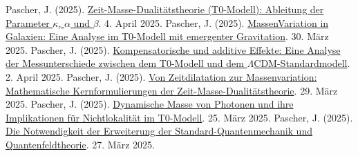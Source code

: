 \documentclass[a4paper,12pt]{article}
\begin{document}
	\begin{thebibliography}{99}
		 Pascher, J. (2025). \href{https://github.com/jpascher/T0-Time-Mass-Duality/tree/main/2/pdf/Deutsch/ZeitMasseT0Params.pdf}{Zeit-Masse-Dualitätstheorie (T0-Modell): Ableitung der Parameter \(\kappa\), \(\alpha\) und \(\beta\)}. 4. April 2025.
		 Pascher, J. (2025). \href{https://github.com/jpascher/T0-Time-Mass-Duality/tree/main/2/pdf/Deutsch/MassVarGalaxien.pdf}{MassenVariation in Galaxien: Eine Analyse im T0-Modell mit emergenter Gravitation}. 30. März 2025.
		 Pascher, J. (2025). \href{https://github.com/jpascher/T0-Time-Mass-Duality/tree/main/2/pdf/Deutsch/MessdifferenzenT0Standard.pdf}{Kompensatorische und additive Effekte: Eine Analyse der Messunterschiede zwischen dem T0-Modell und dem \(\Lambda\)CDM-Standardmodell}. 2. April 2025.
		 Pascher, J. (2025). \href{https://github.com/jpascher/T0-Time-Mass-Duality/tree/main/2/pdf/Deutsch/MathZeitMasseLagrange.pdf}{Von Zeitdilatation zur Massenvariation: Mathematische Kernformulierungen der Zeit-Masse-Dualitätstheorie}. 29. März 2025.
		 Pascher, J. (2025). \href{https://github.com/jpascher/T0-Time-Mass-Duality/tree/main/2/pdf/Deutsch/DynMassePhotonenNichtlokal.pdf}{Dynamische Masse von Photonen und ihre Implikationen für Nichtlokalität im T0-Modell}. 25. März 2025.
		 Pascher, J. (2025). \href{https://github.com/jpascher/T0-Time-Mass-Duality/tree/main/2/pdf/Deutsch/NotwendigkeitQMErweiterung.pdf}{Die Notwendigkeit der Erweiterung der Standard-Quantenmechanik und Quantenfeldtheorie}. 27. März 2025.
	\end{thebibliography}
	
\end{document}
